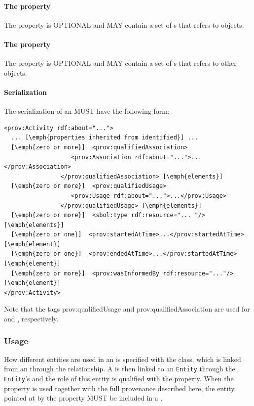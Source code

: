 \paragraph{The  property}\label{sec:usages}
The  property is OPTIONAL and MAY contain a set of s that refers to  objects.

\paragraph{The  property}\label{sec:wasInformedBys}
The  property is OPTIONAL and MAY contain a set of s that refers to other  objects.

\paragraph{Serialization}
The serialization of an  MUST have the following form:


\begin{lstlisting}
<prov:Activity rdf:about="...">
  ... [\emph{properties inherited from identified}] ...
  [\emph{zero or more}]  <prov:qualifiedAssociation>
                   <prov:Association rdf:about="...">...</prov:Association>
                </prov:qualifiedAssociation> [\emph{elements}]
  [\emph{zero or more}]  <prov:qualifiedUsage>
                   <prov:Usage rdf:about="...">...</prov:Usage>
                </prov:qualifiedUsage> [\emph{elements}]
  [\emph{zero or more}]  <sbol:type rdf:resource="... "/>  [\emph{elements}]             
  [\emph{zero or one}]  <prov:startedAtTime>...</prov:startedAtTime> [\emph{element}]
  [\emph{zero or one}]  <prov:endedAtTime>...</prov:startedAtTime> [\emph{element}] 
  [\emph{zero or more}]  <prov:wasInformedBy rdf:resource="..."/> [\emph{element}] 
</prov:Activity>
\end{lstlisting}

Note that the tags prov:qualifiedUsage and prov:qualifiedAssociation are used for  and , respectively.



\subsubsection{Usage}
\label{sec:Usage}
How different entities are used in an  is specified with the  class, which is linked from an  through the  relationship. A  is then linked to an \texttt{Entity} through the \texttt{Entity}'s  and the role of this entity is qualified with the  property. When the  property is used together with the full provenance described here, the entity pointed at by the  property MUST be included in a .


